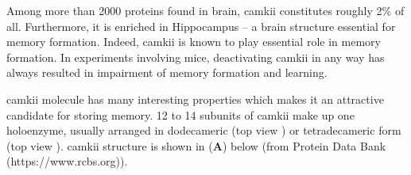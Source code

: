 \documentclass[]{resonance}
\begin{document}
 {
Among more than 2000 proteins found in brain, \gls{camkii} constitutes
roughly 2\% of all. Furthermore, it is enriched in Hippocampus -- a brain
structure essential for memory formation. Indeed, \gls{camkii} is known to
play essential role in memory formation. In experiments involving mice,
deactivating \gls{camkii} in any way has always resulted in impairment of
memory formation and learning. 

\gls{camkii} molecule has many interesting properties which makes it an
attractive candidate for storing memory. 12 to 14 subunits of \gls{camkii} make
up one holoenzyme, usually arranged in dodecameric (top view ) or tetradecameric form (top view ). \gls{camkii}
structure is shown in (\textbf{A}) below (from Protein Data Bank
(https://www.rcbs.org)).

\vspace{5mm}
}
\end{document}
